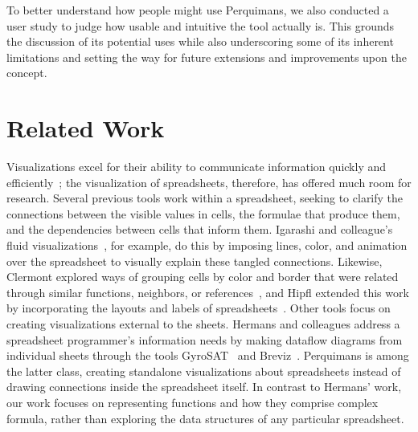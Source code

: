 \documentclass[conference]{IEEEtran}
\newcommand{\toolname}{Perquimans }
\newcommand{\toolnameend}{Perquimans}
\begin{document}
	To better understand how people might use \toolnameend, we also conducted a user study to judge how
	usable and intuitive the tool actually is. This grounds the discussion of its
	potential uses while also underscoring some of its inherent limitations and
	setting the way for future extensions and improvements upon the concept.
	
	\section{Related Work} \label{related-work} Visualizations excel for their ability to
	communicate information quickly and efficiently~\cite{baeza1999modern}; the
	visualization of spreadsheets, therefore, has offered much room for research.
	Several previous tools work within a spreadsheet, seeking to clarify the
	connections between the visible values in cells, the formulae that produce
	them, and the dependencies between cells that inform them. Igarashi and
	colleague's fluid visualizations~\cite{igarashi1998fluid}, for example, do this
	by imposing lines, color, and animation over the spreadsheet to visually
	explain these tangled connections. Likewise, Clermont explored ways of grouping
	cells by color and border that were related through similar functions,
	neighbors, or references~\cite{clermont2003scalable}, and Hipfl extended this
	work by incorporating the layouts and labels of spreadsheets~\cite{hipfl2008using}. Other tools focus on creating visualizations external to
	the sheets. Hermans and colleagues address a spreadsheet programmer's
	information needs by making dataflow diagrams from individual sheets through the
	tools GyroSAT~\cite{hermans2011supporting} and Breviz~\cite{hermans2011breviz}.
	\toolname is among the latter class, creating standalone visualizations about
	spreadsheets instead of drawing connections inside the spreadsheet itself. In contrast to Hermans' work, our work focuses on
	representing functions and how they comprise complex formula, rather than
	exploring the data structures of any particular spreadsheet.  \par
	
\end{document}
